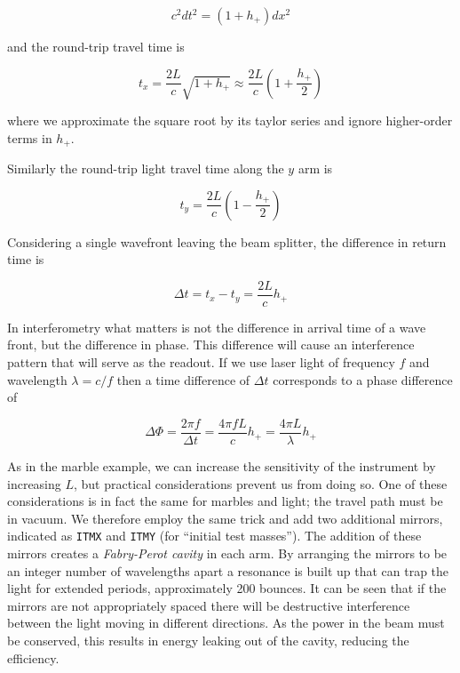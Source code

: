 \begin{equation*}
c^2 dt^2 = (1+h_+) dx^2
\end{equation*}

and the round-trip travel time is

\begin{equation*}
t_x = \frac{2L}{c} \sqrt{1+h_+} \approx \frac{2L}{c} \left(1+\frac{h_+}{2} \right)
\end{equation*}

where we approximate the square root by its taylor series and ignore
higher-order terms in $h_+$.

Similarly the round-trip light travel time along the $y$ arm is

\begin{equation*}
t_y = \frac{2L}{c} \left(1-\frac{h_+}{2} \right)
\end{equation*}


Considering a single wavefront leaving the beam splitter, the
difference in return time is

\begin{equation*}
\Delta t = t_x - t_y = \frac{2L}{c} h_+
\end{equation*}

In interferometry what matters is not the difference in arrival time
of a wave front, but the difference in phase.  This difference will
cause an interference pattern that will serve as the readout.  If we
use laser light of frequency $f$ and wavelength $\lambda = c/f$ then a
time difference of $\Delta t$ corresponds to a phase difference of 

\begin{equation*}
\Delta \Phi = \frac{2\pi f}{\Delta t} = \frac{4\pi f L}{c} h_+
= \frac{4\pi L}{\lambda} h_+
\end{equation*}

As in the marble example, we can increase the sensitivity of the
instrument by increasing $L$, but practical considerations prevent us
from doing so.  One of these considerations is in fact the same for
marbles and light; the travel path must be in vacuum.  We
therefore employ the same trick and add two additional mirrors,
indicated as \texttt{ITMX} and \texttt{ITMY} (for ``initial test
masses'').  The addition of these mirrors creates a \emph{Fabry-Perot
cavity} in each arm.  By arranging the mirrors to be an integer
number of wavelengths apart a resonance is built up that can trap the
light for extended periods, approximately 200 bounces.  It can be seen
that if the mirrors are not appropriately spaced there will be
destructive interference between the light moving in different
directions.  As the power in the beam must be conserved, this results
in energy leaking out of the cavity, reducing the efficiency.

